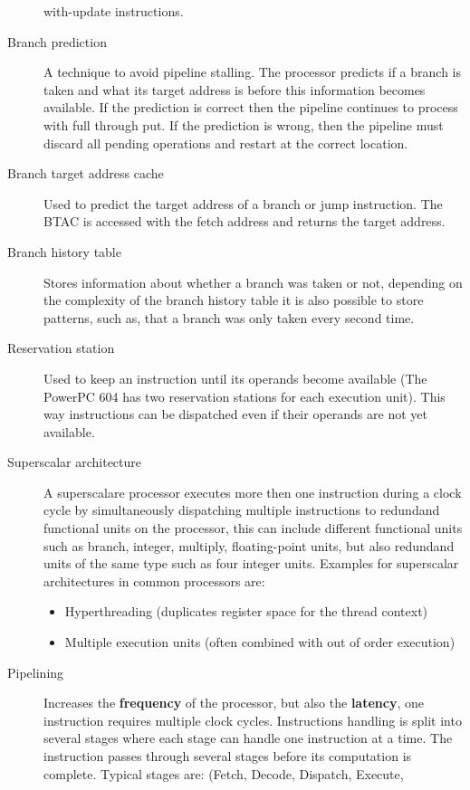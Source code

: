 \documentclass[a4paper,10pt]{article}
\begin{document}
\begin{description}
       with-update instructions.
 \item[Branch prediction] A technique to avoid pipeline stalling. The processor predicts if a branch is taken and what its
       target address is before this information becomes available. If the prediction is correct then the pipeline continues to process
       with full through put. If the prediction is wrong, then the pipeline must discard all pending operations and restart at the
       correct location.
 \item[Branch target address cache] Used to predict the target address of a branch or jump instruction. The BTAC is accessed
       with the fetch address and returns the target address.
 \item[Branch history table] Stores information about whether a branch was taken or not, depending on the complexity of the
       branch history table it is also possible to store patterns, such as, that a branch was only taken every second time.
 \item[Reservation station] Used to keep an instruction until its operands become available (The PowerPC 604 has two
       reservation stations for each execution unit). This way instructions can be dispatched even if their operands are not yet
       available.
 \item[Superscalar architecture] A superscalare processor executes more then one instruction during a clock cycle by
       simultaneously dispatching multiple instructions to redundand functional units on the processor, this can include different
       functional units such as branch, integer, multiply, floating-point units, but also redundand units
       of the same type such as four integer units. Examples for superscalar architectures in common processors are:
	\begin{itemize}
	    \item Hyperthreading (duplicates register space for the thread context)
	    \item Multiple execution units (often combined with out of order execution)
	\end{itemize}
  \item[Pipelining] Increases the \textbf{frequency} of the processor, but also the \textbf{latency}, one instruction requires
multiple clock cycles. Instructions handling is split into several stages where each stage can handle one instruction at a time. The
instruction passes through several stages before its computation is complete. Typical stages are: (Fetch, Decode, Dispatch, Execute,

\end{description}
\end{document}
